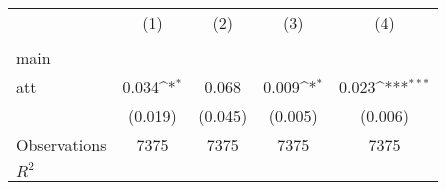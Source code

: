 {
\def\sym#1{\ifmmode^{#1}\else\(^{#1}\)\fi}
\begin{tabular}{l*{4}{c}}
\hline\hline
                    &\multicolumn{1}{c}{(1)}&\multicolumn{1}{c}{(2)}&\multicolumn{1}{c}{(3)}&\multicolumn{1}{c}{(4)}\\
                    &\multicolumn{1}{c}{} &\multicolumn{1}{c}{} &\multicolumn{1}{c}{} &\multicolumn{1}{c}{} \\
\hline
main                &                     &                     &                     &                     \\
att                 &       0.034\sym{*}  &       0.068         &       0.009\sym{*}  &       0.023\sym{***}\\
                    &     (0.019)         &     (0.045)         &     (0.005)         &     (0.006)         \\
\hline
Observations        &        7375         &        7375         &        7375         &        7375         \\
\(R^{2}\)           &                     &                     &                     &                     \\
\hline\hline
\end{tabular}
}
